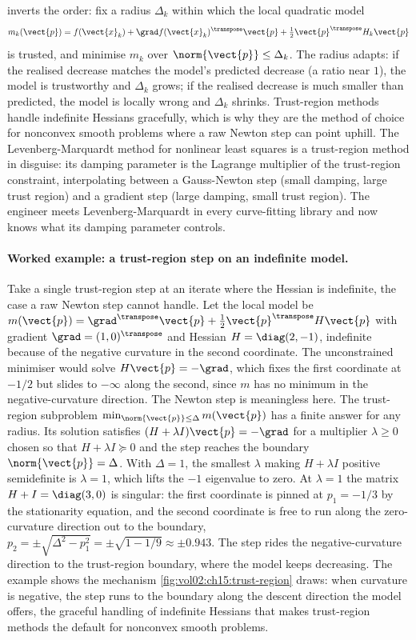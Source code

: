  inverts the order: fix a radius $\Delta_{k}$
within which the local quadratic model
\[
m_{k}(\vect{p}) = f(\vect{x}_{k}) + \grad f(\vect{x}_{k})^{\transpose}
\vect{p} + \tfrac{1}{2} \vect{p}^{\transpose} H_{k} \vect{p}
\]
is trusted, and minimise $m_{k}$ over $\norm{\vect{p}} \leq
\Delta_{k}$. The radius adapts: if the realised decrease matches
the model's predicted decrease (a ratio near $1$), the model is
trustworthy and $\Delta_{k}$ grows; if the realised decrease is
much smaller than predicted, the model is locally wrong and
$\Delta_{k}$ shrinks. Trust-region methods handle indefinite
Hessians gracefully, which is why they are the method of choice
for nonconvex smooth problems where a raw Newton step can point
uphill. The Levenberg-Marquardt method for nonlinear least
squares is a trust-region method in disguise: its damping
parameter is the Lagrange multiplier of the trust-region
constraint, interpolating between a Gauss-Newton step (small
damping, large trust region) and a gradient step (large damping,
small trust region). The engineer meets Levenberg-Marquardt in
every curve-fitting library and now knows what its damping
parameter controls.

\paragraph{Worked example: a trust-region step on an indefinite
model.}
Take a single trust-region step at an iterate where the Hessian is
indefinite, the case a raw Newton step cannot handle. Let the local
model be $m(\vect{p}) = \grad^{\transpose} \vect{p} + \tfrac{1}{2}
\vect{p}^{\transpose} H \vect{p}$ with gradient $\grad = (1, 0)^{
\transpose}$ and Hessian $H = \diag(2, -1)$, indefinite because of the
negative curvature in the second coordinate. The unconstrained
minimiser would solve $H \vect{p} = -\grad$, which fixes the first
coordinate at $-1/2$ but slides to $-\infty$ along the second, since
$m$ has no minimum in the negative-curvature direction. The Newton
step is meaningless here. The trust-region subproblem
$\min_{\norm{\vect{p}} \leq \Delta} m(\vect{p})$ has a finite answer
for any radius. Its solution satisfies $(H + \lambda I) \vect{p} =
-\grad$ for a multiplier $\lambda \geq 0$ chosen so that $H + \lambda
I \succeq 0$ and the step reaches the boundary $\norm{\vect{p}} =
\Delta$. With $\Delta = 1$, the smallest $\lambda$ making $H + \lambda
I$ positive semidefinite is $\lambda = 1$, which lifts the $-1$
eigenvalue to zero. At $\lambda = 1$ the matrix $H + I = \diag(3, 0)$
is singular: the first coordinate is pinned at $p_{1} = -1/3$ by the
stationarity equation, and the second coordinate is free to run along
the zero-curvature direction out to the boundary, $p_{2} = \pm
\sqrt{\Delta^{2} - p_{1}^{2}} = \pm\sqrt{1 - 1/9} \approx \pm 0.943$.
The step rides the negative-curvature direction to the trust-region
boundary, where the model keeps decreasing. The example shows the
mechanism \cref{fig:vol02:ch15:trust-region} draws: when curvature is
negative, the step runs to the boundary along the descent direction the
model offers, the graceful handling of indefinite Hessians that makes
trust-region methods the default for nonconvex smooth problems.

